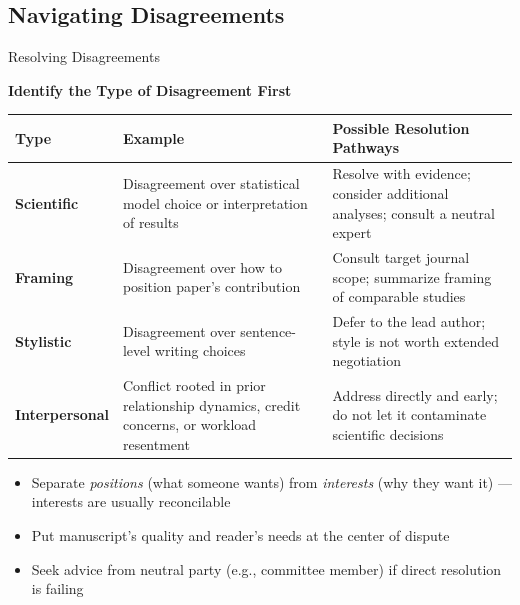 \documentclass{beamer}
\begin{document}
\subsection{Navigating Disagreements}

\begin{frame}{Resolving Disagreements}

  \footnotesize
  \textbf{Identify the Type of Disagreement First}\\
  \smallskip

  {\scriptsize
  \begin{tabular}{@{}lp{3.6cm}p{4cm}@{}}
    \hline
    \textbf{Type} & \textbf{Example} & \textbf{Possible Resolution Pathways} \\
    \hline
    \textbf{Scientific}
      & Disagreement over statistical model choice
        or interpretation of results
      & Resolve with evidence; consider additional
        analyses; consult a neutral expert \\[3pt]
    \textbf{Framing}
      & Disagreement over how to position
        paper's contribution
      & Consult target journal scope; summarize framing of
        comparable studies \\[3pt]
    \textbf{Stylistic}
      & Disagreement over sentence-level writing choices
      & Defer to the lead author; style is not worth
        extended negotiation \\[3pt]
    \textbf{Interpersonal}
      & Conflict rooted in prior relationship dynamics,
        credit concerns, or workload resentment
      & Address directly and early; do not let it
        contaminate scientific decisions \\
    \hline
  \end{tabular}
  }

  \medskip
  \begin{itemize}
    \item Separate \emph{positions} (what someone wants)
      from \emph{interests} (why they want it) ---
      interests are usually reconcilable
    \item Put manuscript's quality and reader's
      needs at the center of dispute
    \item Seek advice from neutral party (e.g., committee member) if direct resolution
      is failing
  \end{itemize}

\end{frame}
\end{document}
